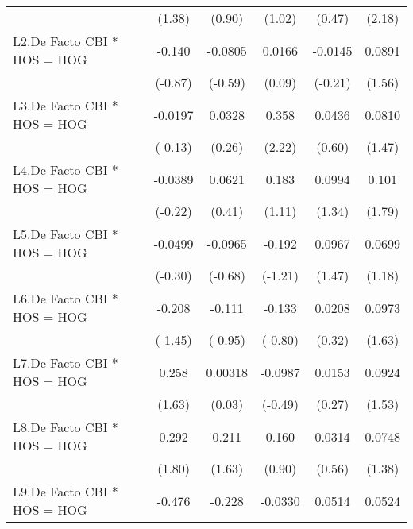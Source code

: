 {\begin{longtable}{l*{5}{c}}
                &   (1.38)         &   (0.90)         &   (1.02)         &   (0.47)         &   (2.18)         \\
\addlinespace
L2.De Facto CBI * HOS = HOG&   -0.140         &  -0.0805         &   0.0166         &  -0.0145         &   0.0891         \\
                &  (-0.87)         &  (-0.59)         &   (0.09)         &  (-0.21)         &   (1.56)         \\
\addlinespace
L3.De Facto CBI * HOS = HOG&  -0.0197         &   0.0328         &    0.358\sym{*}  &   0.0436         &   0.0810         \\
                &  (-0.13)         &   (0.26)         &   (2.22)         &   (0.60)         &   (1.47)         \\
\addlinespace
L4.De Facto CBI * HOS = HOG&  -0.0389         &   0.0621         &    0.183         &   0.0994         &    0.101         \\
                &  (-0.22)         &   (0.41)         &   (1.11)         &   (1.34)         &   (1.79)         \\
\addlinespace
L5.De Facto CBI * HOS = HOG&  -0.0499         &  -0.0965         &   -0.192         &   0.0967         &   0.0699         \\
                &  (-0.30)         &  (-0.68)         &  (-1.21)         &   (1.47)         &   (1.18)         \\
\addlinespace
L6.De Facto CBI * HOS = HOG&   -0.208         &   -0.111         &   -0.133         &   0.0208         &   0.0973         \\
                &  (-1.45)         &  (-0.95)         &  (-0.80)         &   (0.32)         &   (1.63)         \\
\addlinespace
L7.De Facto CBI * HOS = HOG&    0.258         &  0.00318         &  -0.0987         &   0.0153         &   0.0924         \\
                &   (1.63)         &   (0.03)         &  (-0.49)         &   (0.27)         &   (1.53)         \\
\addlinespace
L8.De Facto CBI * HOS = HOG&    0.292         &    0.211         &    0.160         &   0.0314         &   0.0748         \\
                &   (1.80)         &   (1.63)         &   (0.90)         &   (0.56)         &   (1.38)         \\
\addlinespace
L9.De Facto CBI * HOS = HOG&   -0.476\sym{*}  &   -0.228         &  -0.0330         &   0.0514         &   0.0524         \\

\end{longtable}}
